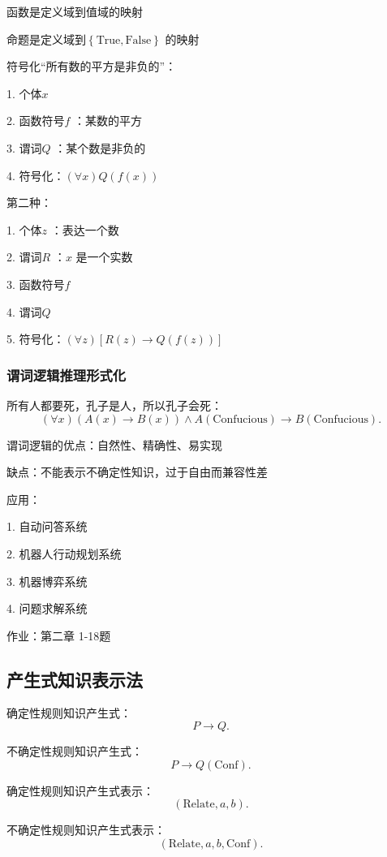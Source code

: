 函数是定义域到值域的映射

命题是定义域到$\left\{ \text{True},\text{False} \right\} $ 的映射
\begin{eg}
	符号化“所有数的平方是非负的”：

	1. 个体$x$

	2. 函数符号$f$ ：某数的平方

	3. 谓词$Q$ ：某个数是非负的

	4. 符号化：$\left( \forall x \right) Q\left( f\left( x \right)  \right) $ 

	第二种：

	1. 个体$z$ ：表达一个数

	2. 谓词$R$ ：$x$ 是一个实数

	3. 函数符号$f$ 

	4. 谓词$Q$ 

	5. 符号化：$\left( \forall z \right) [R\left( z \right) \to Q\left( f\left( z \right)  \right)] $
\end{eg}

\subsubsection*{谓词逻辑推理形式化}%
\label{subsub:谓词逻辑推理形式化}
\begin{eg}
	所有人都要死，孔子是人，所以孔子会死：
	\[
		\left( \forall x \right) \left( A\left( x \right) \to B\left( x \right) \right) \land A\left( \text{Confucious} \right) \to B\left( \text{Confucious} \right) 
	.\] 
\end{eg}

\begin{notation}
	谓词逻辑的优点：自然性、精确性、易实现

	缺点：不能表示不确定性知识，过于自由而兼容性差

	应用：

	1. 自动问答系统

	2. 机器人行动规划系统

	3. 机器博弈系统

	4. 问题求解系统
\end{notation}
作业：第二章 1-18题
\subsection{产生式知识表示法}%
\label{sub:产生式知识表示法}
\begin{notation}
	确定性规则知识产生式：
	\[
		P\to Q
	.\] 
	
	不确定性规则知识产生式：
	\[
		P\to Q \left( \text{Conf} \right) 
	.\] 

	确定性规则知识产生式表示：
	\[
		\left( \text{Relate},a,b \right) 
	.\] 

	不确定性规则知识产生式表示：
	\[
		\left( \text{Relate},a,b,\text{Conf} \right) 
	.\] 
\end{notation}


